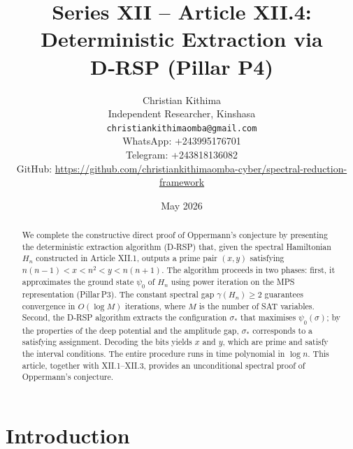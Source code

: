 \documentclass[11pt,a4paper]{article}
\title{Series XII – Article XII.4: Deterministic Extraction via D‑RSP (Pillar P4)}
\author{Christian Kithima \\
Independent Researcher, Kinshasa \\
\texttt{christiankithimaomba@gmail.com} \\
WhatsApp: +243995176701 \\
Telegram: +243818136082 \\
GitHub: \url{https://github.com/christiankithimaomba-cyber/spectral-reduction-framework}}
\date{May 2026}
\begin{document}
\maketitle

\begin{abstract}
We complete the constructive direct proof of Oppermann's conjecture by presenting the deterministic extraction algorithm (D‑RSP) that, given the spectral Hamiltonian \(H_n\) constructed in Article XII.1, outputs a prime pair \((x,y)\) satisfying \(n(n-1)<x<n^2<y<n(n+1)\). The algorithm proceeds in two phases: first, it approximates the ground state \(\psi_0\) of \(H_n\) using power iteration on the MPS representation (Pillar P3). The constant spectral gap \(\gamma(H_n)\ge 2\) guarantees convergence in \(O(\log M)\) iterations, where \(M\) is the number of SAT variables. Second, the D‑RSP algorithm extracts the configuration \(\sigma_*\) that maximises \(\psi_0(\sigma)\); by the properties of the deep potential and the amplitude gap, \(\sigma_*\) corresponds to a satisfying assignment. Decoding the bits yields \(x\) and \(y\), which are prime and satisfy the interval conditions. The entire procedure runs in time polynomial in \(\log n\). This article, together with XII.1–XII.3, provides an unconditional spectral proof of Oppermann's conjecture.
\end{abstract}

\tableofcontents

\section{Introduction}
\end{document}
